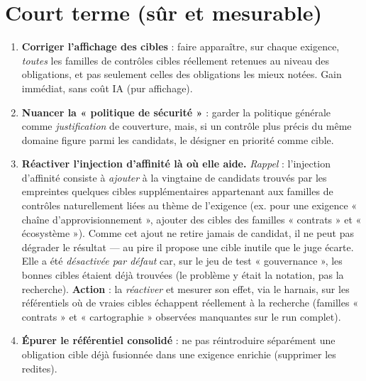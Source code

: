 \documentclass[11pt,a4paper]{report}
\begin{document}
\section{Court terme (sûr et mesurable)}
\begin{enumerate}[nosep]
  \item \textbf{Corriger l'affichage des cibles} : faire apparaître, sur chaque exigence, \emph{toutes} les familles de contrôles cibles réellement retenues au niveau des obligations, et pas seulement celles des obligations les mieux notées. Gain immédiat, sans coût IA (pur affichage).
  \item \textbf{Nuancer la « politique de sécurité »} : garder la politique générale comme \emph{justification} de couverture, mais, si un contrôle plus précis du même domaine figure parmi les candidats, le désigner en priorité comme cible.
  \item \textbf{Réactiver l'injection d'affinité là où elle aide.} \emph{Rappel} : l'injection d'affinité consiste à \emph{ajouter} à la vingtaine de candidats trouvés par les empreintes quelques cibles supplémentaires appartenant aux familles de contrôles naturellement liées au thème de l'exigence (ex. pour une exigence « chaîne d'approvisionnement », ajouter des cibles des familles « contrats » et « écosystème »). Comme cet ajout ne retire jamais de candidat, il ne peut pas dégrader le résultat --- au pire il propose une cible inutile que le juge écarte. Elle a été \emph{désactivée par défaut} car, sur le jeu de test « gouvernance », les bonnes cibles étaient déjà trouvées (le problème y était la notation, pas la recherche). \textbf{Action} : la \emph{réactiver} et mesurer son effet, via le harnais, sur les référentiels où de vraies cibles échappent réellement à la recherche (familles « contrats » et « cartographie » observées manquantes sur le run complet).
  \item \textbf{Épurer le référentiel consolidé} : ne pas réintroduire séparément une obligation cible déjà fusionnée dans une exigence enrichie (supprimer les redites).
\end{enumerate}
\end{document}
